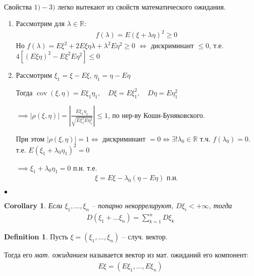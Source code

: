 \documentclass[a4paper]{article}
\theoremstyle{plain}
\newtheorem{corollary}{Corollary}
\theoremstyle{remark}
\theoremstyle{definition}
\newtheorem{definition}{Definition}
\renewenvironment{proof}{{\bfseries Proof}}{$\bullet$}
\newcommand{\setR}{\mathbb{R}}
\newcommand{\walls}[1]{\left | #1 \right |} %
\DeclareMathOperator{\cov}{cov}
\renewcommand{\leq}{\leqslant}
\renewcommand{\geq}{\geqslant}
\begin{document}
\begin{proof}~

  Свойства $1) - 3)$ легко вытекают из свойств математического ожидания.

  \begin{enumerate}[start=4]
    \item 
      Рассмотрим для $\lambda \in \setR:$
      \begin{align*}
        f(\lambda) = E(\xi + \lambda \eta)^2 \geq 0
      \end{align*}
      Но $f(\lambda) = E \xi^2 + 2E \xi \eta \lambda + \lambda^2 E \eta^2 \geq 0$
      $\iff$ дискриминант $\leq 0$, т.е.
      $4 [(E \xi \eta)^2 - E \xi^2 E\eta^2] \leq 0$

    \item 
      Рассмотрим $\xi_1 = \xi - E \xi$, $\eta_1 = \eta - E \eta$

      Тогда $\cov(\xi, \eta) = E \xi_1 \eta_1,\quad D \xi = E \xi_1^2,\quad D \eta = E\eta_1^2$

      $\implies |\rho(\xi, \eta)| = 
      \walls{\frac{E \xi_1 \eta_1}{\sqrt{E \xi_1^2 E\eta_1^2}}} \leq 1$, 
      по нер-ву Коши-Буняковского.

      При этом $|\rho(\xi, \eta)| = 1 \iff$ дискриминант $= 0 
      \iff \exists ! \lambda_0 \in \setR$ т.ч. $f(\lambda_0) = 0$. 
      т.е. $E(\xi_1 + \lambda_0 \eta_1)^2 = 0$

      $\implies \xi_1 + \lambda_0 \eta_1 = 0$ п.н. т.е.
      \begin{align*}
        \xi = E \xi - \lambda_0 (\eta - E \eta) \text{ п.н.}
      \end{align*}
  \end{enumerate}
\end{proof}

\begin{corollary}
  Если $\xi_1, \ldots, \xi_n$ -- попарно некоррелируют, $D \xi_i < +\infty$, тогда
  \begin{align*}
    D(\xi_1 + \ldots \xi_n) = \sum_{k = 1}^{n} D\xi_k
  \end{align*}
\end{corollary}
\begin{definition}
  Пусть $\xi = (\xi_1, \ldots, \xi_n)$ -- случ. вектор.

  Тогда его \emph{мат. ожиданием} называется вектор из мат. ожиданий его компонент:
  \begin{align*}
    E \xi = (E\xi_1, \ldots, E\xi_n)
  \end{align*}
\end{definition}
\end{document}
